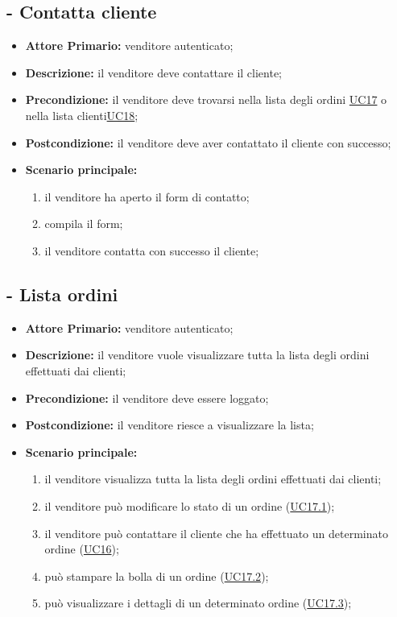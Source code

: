 
\stepUserCase
\subsection{ - Contatta cliente}
\begin{itemize}
    \item \textbf{Attore Primario:} venditore autenticato;
    \item \textbf{Descrizione:} il venditore deve contattare il cliente;
    \item \textbf{Precondizione:} il venditore deve trovarsi nella lista degli ordini \hyperref[UC17]{UC17} o nella lista clienti\hyperref[UC18]{UC18};
    \item \textbf{Postcondizione:} il venditore deve aver contattato il cliente con successo;
    \item \textbf{Scenario principale:}
    \begin{enumerate}
        \item il venditore ha aperto il form di contatto;
        \item compila il form;
        \item il venditore contatta con successo il cliente;
    \end{enumerate}
\end{itemize}

\stepUserCase
\subsection{ - Lista ordini}
\begin{itemize}
    \item \textbf{Attore Primario:} venditore autenticato;
    \item \textbf{Descrizione:} il venditore vuole visualizzare tutta la lista degli ordini effettuati dai clienti;
    \item \textbf{Precondizione:} il venditore deve essere loggato;
    \item \textbf{Postcondizione:} il venditore riesce a visualizzare la lista;
    \item \textbf{Scenario principale:}
    \begin{enumerate}
        \item il venditore visualizza tutta la lista degli ordini effettuati dai clienti;
         \item il venditore può modificare lo stato di un ordine (\hyperref[UC17.1]{UC17.1});
        \item il venditore può contattare il cliente che ha effettuato un determinato ordine (\hyperref[UC16]{UC16});
        \item può stampare la bolla di un ordine (\hyperref[UC17.2]{UC17.2});
        \item può visualizzare i dettagli di un determinato ordine (\hyperref[UC17.3]{UC17.3}); 
    \end{enumerate}
\end{itemize}


